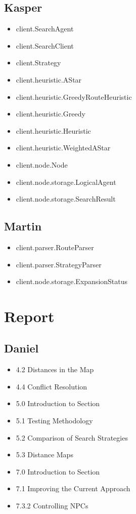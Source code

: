 \documentclass[10pt,a4paper]{article}
\begin{document}
	\subsection{Kasper}
		\begin{itemize}
			\item client.SearchAgent
			\item client.SearchClient
			\item client.Strategy
			\item client.heuristic.AStar
			\item client.heuristic.GreedyRouteHeuristic
			\item client.heuristic.Greedy
			\item client.heuristic.Heuristic
			\item client.heuristic.WeightedAStar
			\item client.node.Node
			\item client.node.storage.LogicalAgent
			\item client.node.storage.SearchResult
		\end{itemize}
	\subsection{Martin}
		\begin{itemize}
			\item client.parser.RouteParser
			\item client.parser.StrategyParser
			\item client.node.storage.ExpansionStatus
		\end{itemize}

\section{Report}
	\subsection{Daniel}
		\begin{itemize}
			\item 4.2 Distances in the Map
			\item 4.4 Conflict Resolution
			\item 5.0 Introduction to Section
			\item 5.1 Testing Methodology
			\item 5.2 Comparison of Search Strategies
			\item 5.3 Distance Maps
			\item 7.0 Introduction to Section
			\item 7.1 Improving the Current Approach
			\item 7.3.2 Controlling NPCs
		\end{itemize}
\end{document}
